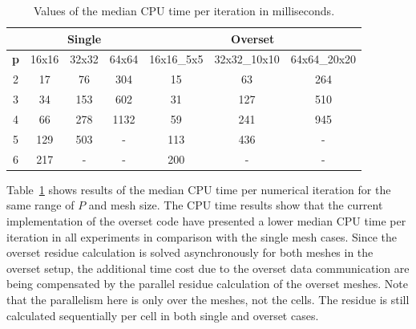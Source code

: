 %
\begin{table}[h]
	\centering
    \caption{Values of the median CPU time per iteration in milliseconds.}
    \label{table:cpu_time_table}
    \begin{tabular}{@{}c|ccc|ccc@{}}
    \hline
    \hline
    & \multicolumn{3}{c|}{\textbf{Single}} & \multicolumn{3}{c}{\textbf{Overset}} \\ \hline
    \textbf{p} & 16x16      & 32x32      & 64x64      & 16x16\_5x5 & 32x32\_10x10 & 64x64\_20x20 \\ \hline
    2          & 17         & 76         & 304        & 15          & 63           & 264          \\ 
    3          & 34         & 153        & 602        & 31          & 127          & 510          \\ 
    4          & 66         & 278        & 1132       & 59          & 241          & 945          \\ 
    5          & 129        & 503        & -          & 113         & 436          & -            \\ 
    6          & 217        & -          & -          & 200         & -            & -            \\ 
    \hline
    \hline
    \end{tabular}
\end{table}

Table\ \ref{table:cpu_time_table} shows results of the median CPU time per numerical iteration for the same range of $P$ and mesh size. The CPU time results show that the current implementation of the overset code have presented a lower median CPU time per iteration in all experiments in comparison with the single mesh cases. Since the overset residue calculation is solved asynchronously for both meshes in the overset setup, the additional time cost due to the overset data communication are being compensated by the parallel residue calculation of the overset meshes. Note that the parallelism here is only over the meshes, not the cells. The residue is still calculated sequentially per cell in both single and overset cases.

